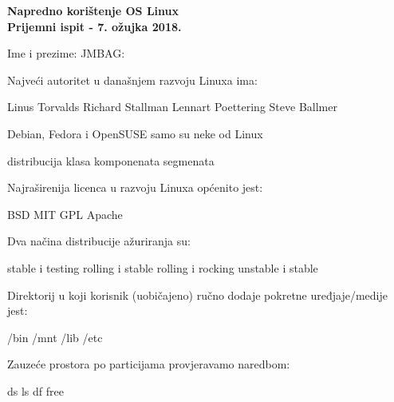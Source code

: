 \documentclass[a4paper,11pt]{exam}
\begin{document}
\firstpageheader
	{}
	{{\large \textbf{Napredno korištenje OS Linux}}\\
		\textbf{Prijemni ispit - 7. ožujka 2018.}}
	{}
\footer
	{}{}{\thepage}
	
Ime i prezime: \fillin[][7cm] \hfill JMBAG: \fillin[][5cm]\\

\begin{questions}
	\question
	Najveći autoritet u današnjem razvoju Linuxa ima:
	
	\begin{oneparchoices}
		\CorrectChoice Linus Torvalds
		\choice Richard Stallman
		\choice Lennart Poettering
		\choice Steve Ballmer
	\end{oneparchoices}
	
	\question
	Debian, Fedora i OpenSUSE samo su neke od Linux
	
	\begin{oneparchoices}
		\CorrectChoice distribucija
		\choice klasa
		\choice komponenata
		\choice segmenata
	\end{oneparchoices}
	
	\question
	Najraširenija licenca u razvoju Linuxa općenito jest:
	
	\begin{oneparchoices}
		\choice BSD
		\choice MIT
		\CorrectChoice GPL
		\choice Apache
	\end{oneparchoices}
	
	\question
  Dva načina distribucije ažuriranja su: 

	\begin{oneparchoices}
		    \choice stable i testing
        \CorrectChoice rolling i stable 
        \choice rolling i rocking
        \choice unstable i stable
	\end{oneparchoices}

	\question
  Direktorij u koji korisnik (uobičajeno) ručno dodaje pokretne uređjaje/medije jest:
	
	\begin{oneparchoices}
        \choice /bin
        \CorrectChoice /mnt
        \choice /lib
        \choice /etc
	\end{oneparchoices}
	
	\question
Zauzeće prostora po particijama provjeravamo naredbom:
	
	\begin{oneparchoices}
		\choice ds 
		\choice ls 
		\CorrectChoice df 
		\choice free
	\end{oneparchoices}
	

\end{questions}
\end{document}
